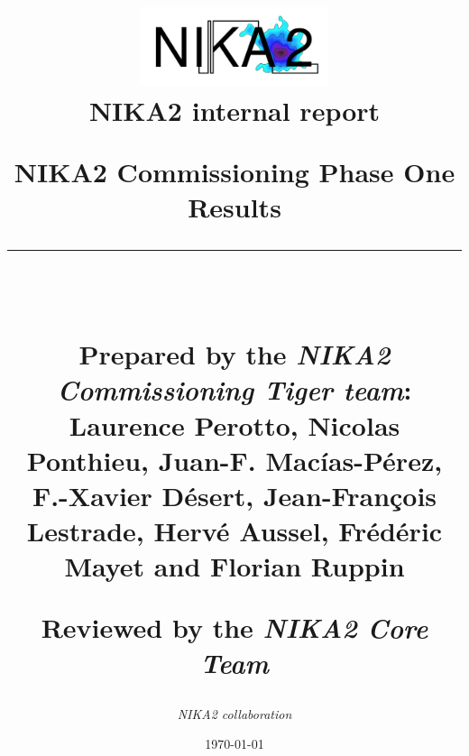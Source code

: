 \documentclass[a4paper, 11pt]{report}
\makeatletter
\renewcommand{\maketitle}{ %
\begin{flushleft} %
{\LARGE\@title} %

\vspace{50pt} %

{\large\@author} %
\\\@date %

\vspace{40pt} %
\end{flushleft}
}
\makeatother
\begin{document}
\title{\parbox{16cm}{
    \includegraphics[width=5.5cm]{Figures/Logo_NIKA2.pdf} \\ [5mm]   
    \textbf{NIKA2 internal report} \\ [5cm]   
    \begin{center}\sf\bfseries\huge
      NIKA2 Commissioning Phase One Results \\ [-4mm]
      \rule{16cm}{1pt}\\ [2cm]   
    \end{center}
    \begin{center} \small
      Prepared by the \emph{NIKA2 Commissioning Tiger team}: \\
      Laurence Perotto,  Nicolas Ponthieu, Juan-F. Mac\'ias-P\'erez,
      F.-Xavier D\'esert, Jean-Fran\c cois Lestrade, Herv\'e Aussel,
      Fr\'ed\'eric Mayet and Florian Ruppin\\ [1cm]     
    \end{center}
    \begin{center} \small
      Reviewed by the \emph{NIKA2 Core Team}\\[4cm]     
    \end{center}
  }
}
\author{{\textit{NIKA2 collaboration}}  }
\date{\today}

\maketitle %
%
%
%


\tableofcontents

\clearpage
\listoffigures
\listoftables

\end{document}
